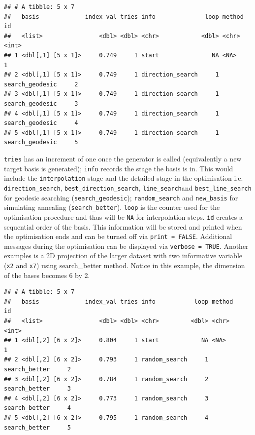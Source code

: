 \documentclass[12pt]{article}
\newenvironment{Shaded}{\begin{snugshade}}{\end{snugshade}}
\newcommand{\DecValTok}[1]{\textcolor[rgb]{0.00,0.00,0.81}{#1}}
\newcommand{\KeywordTok}[1]{\textcolor[rgb]{0.13,0.29,0.53}{\textbf{#1}}}
\newcommand{\NormalTok}[1]{#1}
\newcommand{\OperatorTok}[1]{\textcolor[rgb]{0.81,0.36,0.00}{\textbf{#1}}}
\newcommand{\StringTok}[1]{\textcolor[rgb]{0.31,0.60,0.02}{#1}}
\begin{document}
\begin{verbatim}
## # A tibble: 5 x 7
##   basis             index_val tries info              loop method             id
##   <list>                <dbl> <dbl> <chr>            <dbl> <chr>           <int>
## 1 <dbl[,1] [5 x 1]>     0.749     1 start               NA <NA>                1
## 2 <dbl[,1] [5 x 1]>     0.749     1 direction_search     1 search_geodesic     2
## 3 <dbl[,1] [5 x 1]>     0.749     1 direction_search     1 search_geodesic     3
## 4 <dbl[,1] [5 x 1]>     0.749     1 direction_search     1 search_geodesic     4
## 5 <dbl[,1] [5 x 1]>     0.749     1 direction_search     1 search_geodesic     5
\end{verbatim}

\texttt{tries} has an increment of one once the generator is called
(equivalently a new target basis is generated); \texttt{info} records
the stage the basis is in. This would include the \texttt{interpolation}
stage and the detailed stage in the optimisation i.e.
\texttt{direction\_search}, \texttt{best\_direction\_search},
\texttt{line\_search}and \texttt{best\_line\_search} for geodesic
searching (\texttt{search\_geodesic}); \texttt{random\_search} and
\texttt{new\_basis} for simulating annealing (\texttt{search\_better}).
\texttt{loop} is the counter used for the optimisation procedure and
thus will be \texttt{NA} for interpolation steps. \texttt{id} creates a
sequential order of the basis. This information will be stored and
printed when the optimisation ends and can be turned off via
\texttt{print\ =\ FALSE}. Additional messages during the optimisation
can be displayed via \texttt{verbose\ =\ TRUE}. Another examples is a 2D
projection of the larger dataset with two informative variable
(\texttt{x2} and \texttt{x7}) using search\_better method. Notice in
this example, the dimension of the bases becomes 6 by 2.

\begin{Shaded}
\end{Shaded}

\begin{verbatim}
## # A tibble: 5 x 7
##   basis             index_val tries info           loop method           id
##   <list>                <dbl> <dbl> <chr>         <dbl> <chr>         <int>
## 1 <dbl[,2] [6 x 2]>     0.804     1 start            NA <NA>              1
## 2 <dbl[,2] [6 x 2]>     0.793     1 random_search     1 search_better     2
## 3 <dbl[,2] [6 x 2]>     0.784     1 random_search     2 search_better     3
## 4 <dbl[,2] [6 x 2]>     0.773     1 random_search     3 search_better     4
## 5 <dbl[,2] [6 x 2]>     0.795     1 random_search     4 search_better     5
\end{verbatim}
\end{document}
